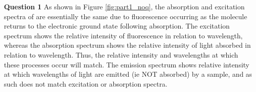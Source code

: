 



\textbf{Question 1}
As shown in Figure \ref{fig:part1_noq}, the absorption and excitation spectra of  are essentially the same due to fluorescence occurring as the molecule returns to the electronic ground state following absorption. The excitation spectrum shows the relative intensity of fluorescence in relation to wavelength, whereas the absorption spectrum shows the relative intensity of light absorbed in relation to wavelength. Thus, the relative intensity and wavelengths at which these processes occur will match.
The emission spectrum shows relative intensity at which wavelengths of light are emitted (ie NOT absorbed) by a sample, and as such does not match excitation or absorption spectra. 

